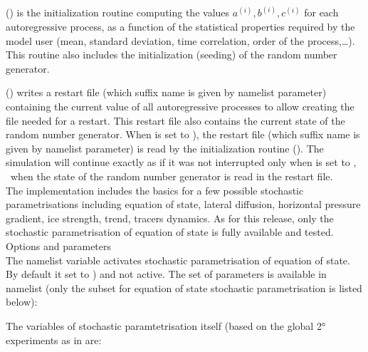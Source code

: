 \documentclass[../main/NEMO_manual]{subfiles}
\begin{document}
() is the initialization routine computing
the values $a^{(i)}, b^{(i)}, c^{(i)}$ for each autoregressive process,
as a function of the statistical properties required by the model user
(mean, standard deviation, time correlation, order of the process,\ldots).
This routine also includes the initialization (seeding) of the random number generator.

() writes a restart file
(which suffix name is given by  namelist parameter) containing the current value of
all autoregressive processes to allow creating the file needed for a restart.
This restart file also contains the current state of the random number generator.
When  is set to ),
the restart file (which suffix name is given by  namelist parameter) is read by
the initialization routine ().
The simulation will continue exactly as if it was not interrupted only
when  is set to ,
\ie\ when the state of the random number generator is read in the restart file.\\

The implementation includes the basics for a few possible stochastic parametrisations including equation of state,
lateral diffusion, horizontal pressure gradient, ice strength, trend, tracers dynamics.
As for this release, only the stochastic parametrisation of equation of state is fully available and tested. \\

Options and parameters \\

The  namelist variable activates stochastic parametrisation of equation of state.
By default it set to ) and not active.
The set of parameters is available in  namelist
(only the subset for equation of state stochastic parametrisation is listed below):

\begin{listing}
  \caption{}
  \label{lst:namsto}
\end{listing}

The variables of stochastic paramtetrisation itself (based on the global 2° experiments as in \cite{brankart_OM13} are:
\end{document}
